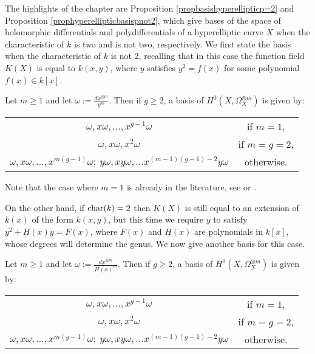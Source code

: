 The highlights of the chapter are Proposition \ref{propbasishyperellipticp=2} and Proposition \ref{prophyperellipticbasispnot2}, which give bases of the space of holomorphic differentials and polydifferentials of a hyperelliptic curve $X$ when the characteristic of $k$ is two and is not two, respectively.
We first state the basis when the characteristic of $k$ is not 2, recalling that in this case the function field $K(X)$ is equal to $k(x,y)$, where $y$ satisfies $y^2 = f(x)$ for some polynomial $f(x) \in k[x]$.
    \begin{unnumprop}
    Let $m\geq 1$ and let $\omega := \frac{dx^{\otimes m}}{y^m}$. 
    Then if $g\geq 2$, a basis of $H^0(X,\Omega_X^{\otimes m})$ is given by:
        {\centering 
        \begin{tabular}{c c}
        $\omega, x\omega, \ldots , x^{g-1}\omega$ &  if $m=1$, \\
        $\omega, x\omega, x^2\omega$  &  if $m=g=2$, \\
        $\omega, x\omega, \ldots, x^{m(g-1)}\omega;\  y\omega, xy\omega, \ldots x^{(m-1)(g-1)-2}y\omega$ &  otherwise.
        \end{tabular}\par
        }
    \end{unnumprop}
    
Note that the case where $m=1$ is already in the literature, see \cite[Prop. 7.4.26]{liu} or \cite[Ch. IV, \S 4, Prop. 4.3]{griffiths}.
 
On the other hand, if $\operatorname{char}(k) = 2$ then $K(X)$ is still equal to an extension of $k(x)$ of the form $k(x,y)$, but this time we require $y$ to satisfy $y^2 + H(x)y = F(x)$, where $F(x)$ and $H(x)$ are polynomials in $k[x]$, whose degrees will determine the genus.
We now give another basis for this case.
    \begin{unnumprop}
    Let $m\geq 1$ and let $\omega:= \frac{dx^{\otimes m}}{H(x)^m}$. 
    Then if $g\geq 2$, a basis of $H^0(X,\Omega_X^{\otimes m})$ is given by:\\
        {\centering
        \begin{tabular}{c c}
        $\omega, x\omega, \ldots , x^{g-1}\omega$ &  if $m=1$, \\
        $\omega, x\omega, x^2\omega$ & if $m=g=2$, \\
        $\omega, x\omega, \ldots, x^{m(g-1)}\omega;\  y\omega, xy\omega, \ldots x^{(m-1)(g-1)-2}y\omega$ & otherwise.
        \end{tabular}\par
        }
    \end{unnumprop}
    
